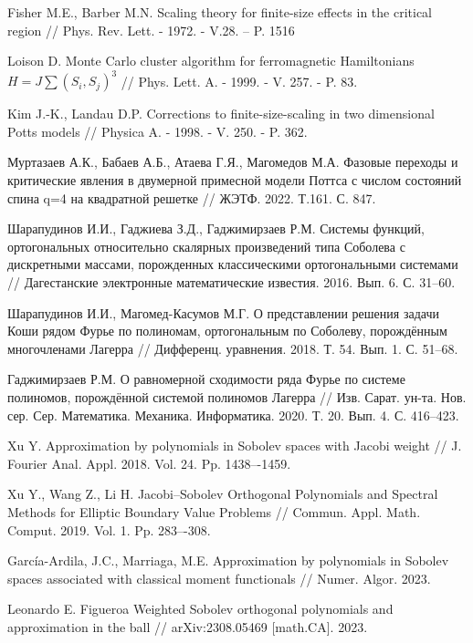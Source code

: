 \begin{thebibliography}{111}
Fisher M.E., Barber M.N. Scaling theory for finite-size effects in the critical region // Phys. Rev. Lett. - 1972. - V.28. -- P. 1516

Loison D. Monte Carlo cluster algorithm for ferromagnetic Hamiltonians $H = J\sum(S_i, S_j)^3$ // Phys. Lett. A. - 1999. - V. 257. - P. 83.

Kim J.-K., Landau D.P. Corrections to finite-size-scaling in two dimensional Potts models // Physica A. - 1998. - V. 250. - P. 362.

Муртазаев А.К., Бабаев А.Б., Атаева Г.Я., Магомедов М.А. Фазовые переходы и критические явления в двумерной примесной модели Поттса с числом состояний спина q=4 на квадратной решетке // ЖЭТФ. 2022. Т.161. С. 847.


{Шарапудинов И.И., Гаджиева З.Д., Гаджимирзаев Р.М.} Системы функций, ортогональных относительно скалярных произведений типа Соболева с дискретными массами, порожденных классическими ортогональными системами // Дагестанские электронные математические известия. 2016. Вып. 6. С. 31--60.

{Шарапудинов И.И., Магомед-Касумов М.Г.} О представлении решения задачи Коши рядом Фурье по полиномам, ортогональным по Соболеву, порождённым многочленами Лагерра // Дифференц. уравнения. 2018. Т. 54. Вып. 1. С. 51--68.

{Гаджимирзаев Р.М.} О равномерной сходимости ряда Фурье по системе полиномов, порождённой системой полиномов Лагерра // Изв. Сарат. ун-та. Нов. сер. Сер. Математика. Механика. Информатика. 2020. Т. 20. Вып. 4. С. 416--423.


{Xu Y.} Approximation by polynomials in Sobolev spaces with Jacobi weight // J. Fourier Anal. Appl. 2018. Vol. 24. Pp. 1438–-1459.


{Xu Y., Wang Z., Li H.} Jacobi–Sobolev Orthogonal Polynomials and Spectral Methods for Elliptic Boundary Value Problems //
Commun. Appl. Math. Comput. 2019. Vol. 1. Pp. 283–-308.

{Garc\'ia-Ardila, J.C., Marriaga, M.E.} Approximation by polynomials in Sobolev spaces associated with classical moment functionals //
Numer. Algor. 2023.

{Leonardo E. Figueroa} Weighted Sobolev orthogonal polynomials and approximation in the ball // arXiv:2308.05469 [math.CA]. 2023.


\end{thebibliography}
